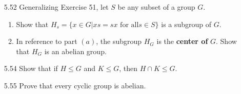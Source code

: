 \documentclass[12pt]{article}
\begin{document}
\begin{enumerate}
		\item[5.52] Generalizing Exercise 51, let $S$ be any subset of a group $G$.
		
		\begin{enumerate}
			\item Show that $H_s = \{x \in G|xs = sx \text{ for all} s \in S\}$ is a subgroup of $G$. 
			\item In reference to part $(a)$, the subgroup $H_G$ is the \textbf{center of} $G$. Show that $H_G$ is an abelian group.
		\end{enumerate}
		
		\item[5.54] Show that if $H \leq G$ and $K \leq G$, then $H\cap K \leq G$.
		\item[5.55] Prove that every cyclic group is abelian.
		
	\end{enumerate}
\end{document}
